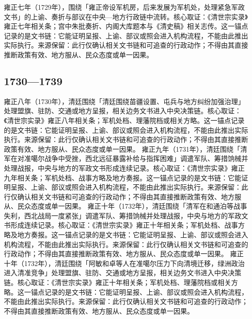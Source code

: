 雍正七年（1729年），围绕「雍正帝设军机房，后来发展为军机处，处理紧急军政文书」的上谕、奏折与部议在中央—地方行政链中流转。核心取证：《清世宗实录》雍正七年相关条；宫中朱批奏折、内阁大库题本与《清史稿》相关志传。这一锚点记录的是文书链：它能证明呈报、上谕、部议或照会进入机构流程，不能由此推出实际执行。来源保留：此行仅确认相关文书链和可追查的行政动作；不得由其直接推断政策有效、地方服从、民众态度或单一因果。
\subsection{1730—1739}
雍正八年（1730年），清廷围绕「清廷围绕苗疆设置、屯兵与地方纠纷加强治理」处理盟旗、驻防、交通或地方呈报，相关边务文书进入中央决策链。核心取证：《清世宗实录》雍正八年相关条；军机处档、理藩院档或相关方略。这一锚点记录的是文书链：它能证明呈报、上谕、部议或照会进入机构流程，不能由此推出实际执行。来源保留：此行仅确认相关文书链和可追查的行政动作；不得由其直接推断政策有效、地方服从、民众态度或单一因果。
雍正九年（1731年），清廷围绕「清军在对准噶尔战争中受挫，西北远征暴露补给与指挥困难」调遣军队、筹措饷械并处理战报，中央与地方的军政文书形成连续记录。核心取证：《清世宗实录》雍正九年相关条；军机处档、战事方略及地方奏报。这一锚点记录的是文书链：它能证明呈报、上谕、部议或照会进入机构流程，不能由此推出实际执行。来源保留：此行仅确认相关文书链和可追查的行政动作；不得由其直接推断政策有效、地方服从、民众态度或单一因果。
雍正十年（1732年），清廷围绕「清军在和通泊等战事失利，西北战局一度紧张」调遣军队、筹措饷械并处理战报，中央与地方的军政文书形成连续记录。核心取证：《清世宗实录》雍正十年相关条；军机处档、战事方略及地方奏报。这一锚点记录的是文书链：它能证明呈报、上谕、部议或照会进入机构流程，不能由此推出实际执行。来源保留：此行仅确认相关文书链和可追查的行政动作；不得由其直接推断政策有效、地方服从、民众态度或单一因果。
雍正十年（1732年），清廷围绕「阿敏和卓等人在准噶尔压力下向清境迁移，绿洲政治进入清准竞争」处理盟旗、驻防、交通或地方呈报，相关边务文书进入中央决策链。核心取证：《清世宗实录》雍正十年相关条；军机处档、理藩院档或相关方略。这一锚点记录的是文书链：它能证明呈报、上谕、部议或照会进入机构流程，不能由此推出实际执行。来源保留：此行仅确认相关文书链和可追查的行政动作；不得由其直接推断政策有效、地方服从、民众态度或单一因果。
